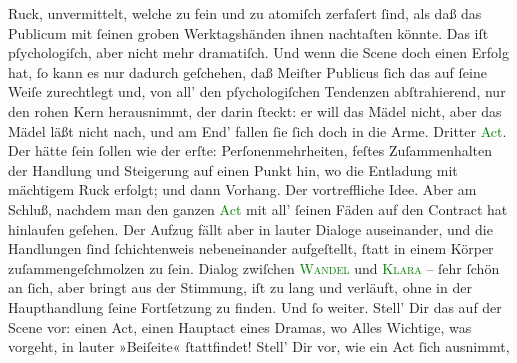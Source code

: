                Ruck, unvermittelt, welche zu fein und zu atomiſch zerfaſert ſind, als daß das
               Publicum mit ſeinen groben Werktagshänden ihnen nachtaſten könnte. Das iſt
               pſychologiſch, aber nicht mehr dramatiſch. Und wenn die Scene doch einen Erfolg hat,
               ſo kann es nur dadurch geſchehen, daß Meiſter Publicus ſich das auf ſeine Weiſe
               zurechtlegt und, von all’  den pſychologiſchen  Tendenzen abſtrahierend, nur den rohen Kern herausnimmt, der darin ſteckt: er
               will das Mädel nicht, aber das Mädel läßt nicht nach, und am End’ fallen ſie ſich
               doch in die Arme. Dritter \textcolor{green}{Act}{}.
               Der hätte ſein ſollen wie der erſte: Perſonenmehrheiten, feſtes Zuſammenhalten der
               Handlung und Steigerung  auf einen Punkt hin, wo
               die Entladung mit mächtigem Ruck erfolgt; und dann Vorhang. Der \label{K_L02674-88v}\label{K_L02674-88h}{ }{\pb}vortreffliche Idee. Aber am Schluß, nachdem man den
               ganzen \textcolor{green}{Act}{} mit all’ ſeinen
               Fäden auf den Contract hat hinlaufen geſehen. Der Aufzug fällt aber in lauter Dialoge
               auseinander, und die Handlungen ſind ſchichtenweis nebeneinander aufgeſtellt, ſtatt
               in einem Körper zuſammengeſchmolzen zu ſein. Dialog zwiſchen \textsc{\textcolor{green}{Wandel}{}} und \textsc{\textcolor{green}{Klara}{}} – ſehr ſchön an ſich, aber bringt aus der Stimmung, iſt zu lang und verläuft,
               ohne in der Haupthandlung ſeine Fortſetzung zu finden. Und ſo weiter. Stell’ Dir das
               auf der Scene vor: einen Act, einen Hauptact eines Dramas, wo Alles Wichtige, was
               vorgeht, in lauter »Beiſeite« ſtattfindet! Stell’ Dir vor, wie ein Act ſich ausnimmt,
